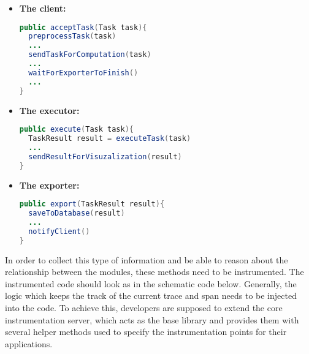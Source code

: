 \begin{itemize}
\item \textbf{The client:}
\begin{lstlisting}[language=Java]
public acceptTask(Task task){
  preprocessTask(task)
  ...
  sendTaskForComputation(task)
  ...
  waitForExporterToFinish()
  ...
}
\end{lstlisting}

\item \textbf{The executor:}
\begin{lstlisting}[language=Java]
public execute(Task task){
  TaskResult result = executeTask(task)
  ...
  sendResultForVisuzalization(result)
}
\end{lstlisting}

\item \textbf{The exporter:}
\begin{lstlisting}[language=Java]
public export(TaskResult result){
  saveToDatabase(result)
  ...
  notifyClient()
}
\end{lstlisting}
\end{itemize}

In order to collect this type of information and be able to reason about the relationship between the modules, these methods need to be instrumented. The instrumented code should look as in the schematic code below. Generally, the logic which keeps the track of the current trace and span needs to be injected into the code. To achieve this, developers are supposed to extend the core instrumentation server, which acts as the base library and provides them with several helper methods used to specify the instrumentation points for their applications. 

